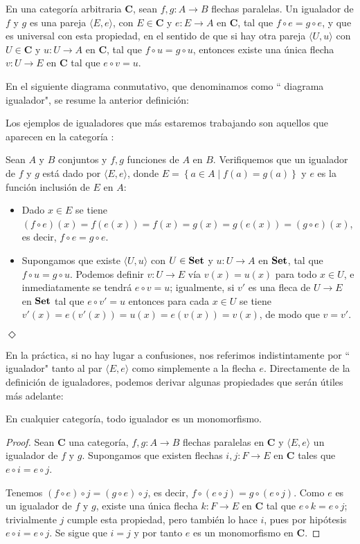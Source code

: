 \begin{Def}
   En una categoría arbitraria $\textbf{C}$, sean $f,g:A\to B$ flechas paralelas. Un igualador de $f$ y $g$ es una pareja $\langle E,e\rangle$, con $E\in\textbf{C}$ y $e:E\to A$ en $\textbf{C}$, tal que $f\circ e=g\circ e$, y que es universal con esta propiedad, en el sentido de que si hay otra pareja $\langle U,u\rangle$ con $U\in \textbf{C}$ y $u:U\to A$ en $\textbf{C}$, tal que $f\circ u=g\circ u$, entonces existe una única flecha $v:U\to E$ en $\textbf{C}$ tal que $e\circ v=u$. 
\end{Def}
En el siguiente diagrama conmutativo, que denominamos como `` diagrama igualador", se resume la anterior definición:


Los ejemplos de igualadores que más estaremos trabajando son aquellos que aparecen en la categoría :
\begin{Ejm}
   Sean $A$ y $B$ conjuntos y $f,g$ funciones de $A$ en $B$. Verifiquemos que un igualador de $f$ y $g$ está dado por $\langle E,e\rangle$, donde $E=\left\lbrace a\in A\mid f(a)=g(a)\right\rbrace$ y $e$ es la función inclusión de $E$ en $A$:
   \begin{itemize}
      \item Dado $x\in E$ se tiene $(f\circ e)(x)=f(e(x))=f(x)=g(x)=g(e(x))=(g\circ e)(x)$, es decir, $f\circ e=g\circ e$.
      \item Supongamos que existe $\langle U,u\rangle$ con $U\in \normalfont{\textbf{Set}}$ y $u:U\to A$ en $\normalfont{\textbf{Set}}$, tal que $f\circ u=g\circ u$. Podemos definir $v:U\to E$ vía $v(x)=u(x)$ para todo $x\in U$, e inmediatamente se tendrá $e\circ v=u$; igualmente, si $v'$ es una fleca de $U\to E$ en $\normalfont{\textbf{Set}}$ tal que $e\circ v'=u$ entonces para cada $x\in U$ se tiene $v'(x)=e(v'(x))=u(x)=e(v(x))=v(x)$, de modo que $v=v'$.
   \end{itemize}
\hspace{\fill}$\Diamond$
\end{Ejm}
En la práctica, si no hay lugar a confusiones, nos referimos indistintamente por `` igualador" tanto al par $\langle E,e\rangle$ como simplemente a la flecha $e$. Directamente de la definición de igualadores, podemos derivar algunas propiedades que serán útiles más adelante:
\begin{Prop}\label{Prop:Igualadores1}
   En cualquier categoría, todo igualador es un monomorfismo.  
\end{Prop}
\begin{proof}
   Sean $\textbf{C}$ una categoría, $f,g:A\to B$ flechas paralelas en $\textbf{C}$ y $\langle E,e\rangle$ un igualador de $f$ y $g$. Supongamos que existen flechas $i,j:F\to E$ en $\textbf{C}$ tales que $e\circ i=e\circ j$.
   
   Tenemos $(f\circ e)\circ j=(g\circ e)\circ j$, es decir, $f\circ (e\circ j)=g\circ (e\circ j)$. Como $e$ es un igualador de $f$ y $g$, existe una única flecha $k:F\to E$ en $\textbf{C}$ tal que $e\circ k=e\circ j$; trivialmente $j$ cumple esta propiedad, pero también lo hace $i$, pues por hipótesis $e\circ i=e\circ j$. Se sigue que $i=j$ y por tanto $e$ es un monomorfismo en $\textbf{C}$.

\end{proof}
